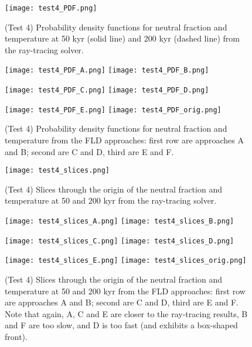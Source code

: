 \documentclass[letterpaper,11pt]{article}
\begin{document}
\begin{figure}[t]
  \centerline{
  \texttt{[image: test4\_PDF.png]}
  }
  \caption{(Test 4) Probability density functions for neutral fraction
    and temperature at 50 kyr (solid line) and 200 kyr (dashed line)
    from the ray-tracing solver.} 
  \label{fig:test4_PDF_RT}
\end{figure}

\begin{figure}[t]
  \centerline{\hfill
  \texttt{[image: test4\_PDF\_A.png]}
  \texttt{[image: test4\_PDF\_B.png]}
  \hfill}
  \centerline{\hfill
  \texttt{[image: test4\_PDF\_C.png]}
  \texttt{[image: test4\_PDF\_D.png]}
  \hfill}
  \centerline{\hfill
  \texttt{[image: test4\_PDF\_E.png]}
  \texttt{[image: test4\_PDF\_orig.png]}
  \hfill}
  \caption{(Test 4) Probability density functions for neutral fraction
    and temperature from the FLD approaches: first row are approaches
    A and B; second are C and D, third are E and F.}
  \label{fig:test4_PDF}
\end{figure}


\begin{figure}[t]
  \centerline{
  \texttt{[image: test4\_slices.png]}
  }
  \caption{(Test 4) Slices through the origin of the neutral fraction
    and temperature at 50 and 200 kyr from the ray-tracing solver.}
  \label{fig:test4_slices_RT}
\end{figure}

\begin{figure}[t]
  \centerline{\hfill
  \texttt{[image: test4\_slices\_A.png]}
  \texttt{[image: test4\_slices\_B.png]}
  \hfill}
  \centerline{\hfill
  \texttt{[image: test4\_slices\_C.png]}
  \texttt{[image: test4\_slices\_D.png]}
  \hfill}
  \centerline{\hfill
  \texttt{[image: test4\_slices\_E.png]}
  \texttt{[image: test4\_slices\_orig.png]}
  \hfill}
  \caption{(Test 4) Slices through the origin of the neutral fraction
    and temperature at 50 and 200 kyr from the FLD approaches: first
    row are approaches A and B; second are C and D, third are E and
    F.  Note that again, A, C and E are closer to the ray-tracing
    results, B and F are too slow, and D is too fast (and exhibits a
    box-shaped front).}
  \label{fig:test4_slices}
\end{figure}
\end{document}
